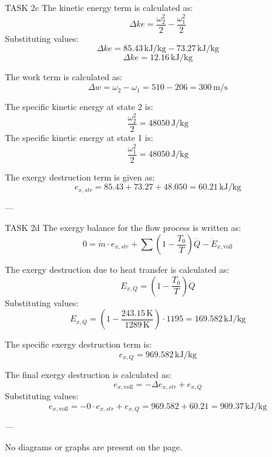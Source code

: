 TASK 2c  
The kinetic energy term is calculated as:  
\[
\Delta ke = \frac{\omega_2^2}{2} - \frac{\omega_1^2}{2}
\]  
Substituting values:  
\[
\Delta ke = 85.43 \, \text{kJ/kg} - 73.27 \, \text{kJ/kg}
\]  
\[
\Delta ke = 12.16 \, \text{kJ/kg}
\]  

The work term is calculated as:  
\[
\Delta w = \omega_2 - \omega_1 = 510 - 206 = 300 \, \text{m/s}
\]  

The specific kinetic energy at state 2 is:  
\[
\frac{\omega_2^2}{2} = 48050 \, \text{J/kg}
\]  
The specific kinetic energy at state 1 is:  
\[
\frac{\omega_1^2}{2} = 48050 \, \text{J/kg}
\]  

The exergy destruction term is given as:  
\[
e_{x,str} = 85.43 + 73.27 + 48.050 = 60.21 \, \text{kJ/kg}
\]  

---

TASK 2d  
The exergy balance for the flow process is written as:  
\[
0 = \dot{m} \cdot e_{x,str} + \sum \left( 1 - \frac{T_0}{T} \right) \dot{Q} - \dot{E}_{x,\text{voll}}
\]  

The exergy destruction due to heat transfer is calculated as:  
\[
E_{x,Q} = \left( 1 - \frac{T_0}{T} \right) \dot{Q}
\]  
Substituting values:  
\[
E_{x,Q} = \left( 1 - \frac{243.15 \, \text{K}}{1289 \, \text{K}} \right) \cdot 1195 = 169.582 \, \text{kJ/kg}
\]  

The specific exergy destruction term is:  
\[
e_{x,Q} = 969.582 \, \text{kJ/kg}
\]  

The final exergy destruction is calculated as:  
\[
e_{x,\text{voll}} = - \Delta e_{x,str} + e_{x,Q}
\]  
Substituting values:  
\[
e_{x,\text{voll}} = -0 \cdot e_{x,str} + e_{x,Q} = 969.582 + 60.21 = 909.37 \, \text{kJ/kg}
\]  

---

No diagrams or graphs are present on the page.